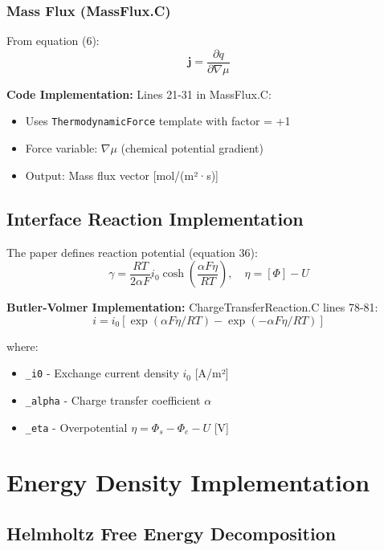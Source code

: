 \documentclass[11pt,a4paper]{article}
\begin{document}
\subsubsection{Mass Flux (MassFlux.C)}
From equation (6):
\begin{equation}
\mathbf{j} = \frac{\partial q}{\partial \nabla\mu}
\end{equation}

\textbf{Code Implementation:} Lines 21-31 in MassFlux.C:
\begin{itemize}
\item Uses \texttt{ThermodynamicForce} template with factor = +1
\item Force variable: $\nabla\mu$ (chemical potential gradient)
\item Output: Mass flux vector [mol/(m²·s)]
\end{itemize}

\subsection{Interface Reaction Implementation}

The paper defines reaction potential (equation 36):
\begin{equation}
\gamma = \frac{RT}{2\alpha F} i_0 \cosh\left(\frac{\alpha F \eta}{RT}\right), \quad \eta = [\Phi] - U
\end{equation}

\textbf{Butler-Volmer Implementation:} ChargeTransferReaction.C lines 78-81:
\begin{equation}
i = i_0 [\exp(\alpha F \eta / RT) - \exp(-\alpha F \eta / RT)]
\end{equation}

where:
\begin{itemize}
\item \texttt{\_i0} - Exchange current density $i_0$ [A/m²]
\item \texttt{\_alpha} - Charge transfer coefficient $\alpha$
\item \texttt{\_eta} - Overpotential $\eta = \Phi_s - \Phi_e - U$ [V]
\end{itemize}

\section{Energy Density Implementation}

\subsection{Helmholtz Free Energy Decomposition}
\end{document}
